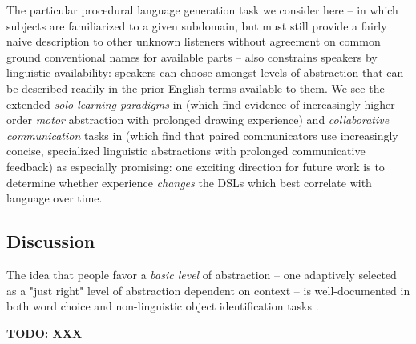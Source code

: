 \documentclass[10pt,letterpaper]{article}
\begin{document}
The particular procedural language generation task we consider here -- in which subjects are familiarized to a given subdomain, but must still provide a fairly naive description to other unknown listeners without agreement on common ground conventional names for available parts -- also constrains speakers by linguistic availability: speakers can choose amongst levels of abstraction that can be described readily in the prior English terms available to them. We see the extended \textit{solo learning paradigms} in  (which find evidence of increasingly higher-order \textit{motor} abstraction with prolonged drawing experience) and \textit{collaborative communication} tasks in  (which find that paired communicators use increasingly concise, specialized linguistic abstractions with prolonged communicative feedback) as especially promising: one exciting direction for future work is to determine whether experience \textit{changes} the DSLs which best correlate with language over time. 


\subsection{Discussion}

The idea that people favor a \textit{basic level} of abstraction -- one adaptively selected as a "just right" level of abstraction dependent on context -- is well-documented in both word choice and non-linguistic object identification tasks . 


  
  

\textbf{TODO: XXX}
\end{document}
